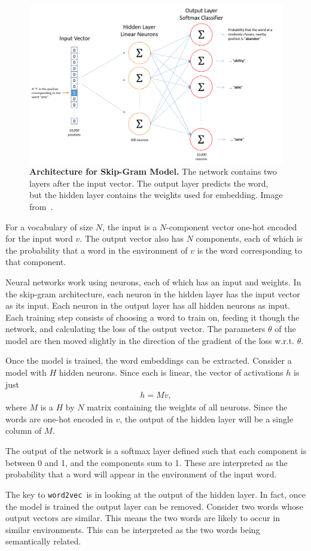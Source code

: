 \documentclass{article} %
\newcommand{\wordtvec}{\texttt{word2vec}}
\begin{document}
	\begin{figure}[h]
		\centering
		\includegraphics[width=.5\textwidth]{skip_gram_net_arch}
		\caption{\textbf{Architecture for Skip-Gram Model.} The network contains two layers after the input vector. The output layer predicts the word, but the hidden layer contains the weights used for embedding. Image from~\cite{mccormick}.}
		\label{fig:skipgram}
	\end{figure}
	
	For a vocabulary of size $N$, the input is a $N$-component vector one-hot encoded for the input word $v$. The output vector also has $N$ components, each of which is the probability that a word in the environment of $v$ is the word corresponding to that component. 
	
	Neural networks work using neurons, each of which has an input and weights. In the skip-gram architecture, each neuron in the hidden layer has the input vector as its input. Each neuron in the output layer has all hidden neurons as input. Each training step consists of choosing a word to train on, feeding it though the network, and calculating the loss of the output vector. The parameters $\theta$ of the model are then moved slightly in the direction of the gradient of the loss w.r.t. $\theta$.
	
	Once the model is trained, the word embeddings can be extracted. Consider a model with $H$ hidden neurons. Since each is linear, the vector of activations $h$ is just
	\begin{align}
	h=Mv, \label{eqn:hidden}
	\end{align}
	where $M$ is a $H$ by $N$ matrix containing the weights of all neurons. Since the words are one-hot encoded in $v$, the output of the hidden layer will be a single column of $M$. 
	
	The output of the network is a softmax layer defined such that each component is between 0 and 1, and the components sum to 1. These are interpreted as the probability that a word will appear in the environment of the input word.
	
	The key to \wordtvec\ is in looking at the output of the hidden layer. In fact, once the model is trained the output layer can be removed. Consider two words whose output vectors are similar. This means the two words are likely to occur in similar environments. This can be interpreted as the two words being semantically related. 
	
\end{document}

